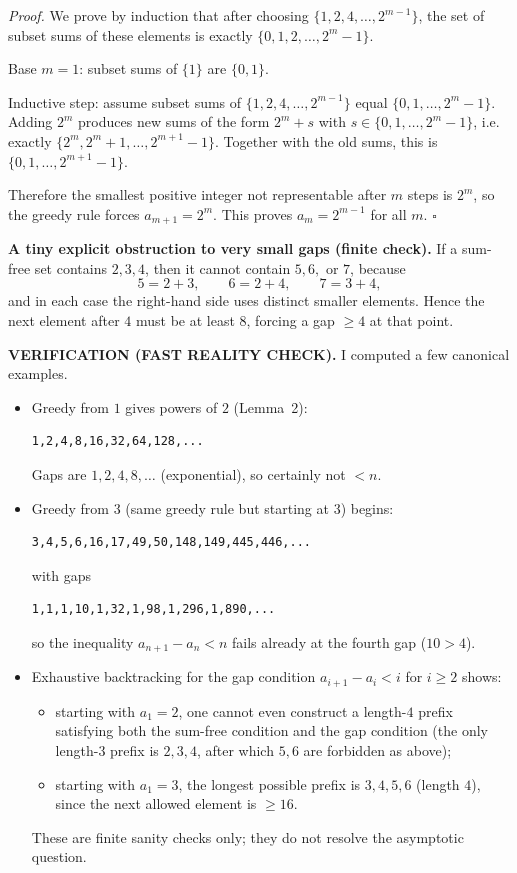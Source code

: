 \noindent\emph{Proof.}
We prove by induction that after choosing $\{1,2,4,\dots,2^{m-1}\}$, the set of subset sums of these elements is exactly $\{0,1,2,\dots,2^{m}-1\}$.

Base $m=1$: subset sums of $\{1\}$ are $\{0,1\}$.

Inductive step: assume subset sums of $\{1,2,4,\dots,2^{m-1}\}$ equal $\{0,1,\dots,2^m-1\}$. Adding $2^m$ produces new sums of the form $2^m+s$ with $s\in\{0,1,\dots,2^m-1\}$, i.e. exactly $\{2^m,2^m+1,\dots,2^{m+1}-1\}$. Together with the old sums, this is $\{0,1,\dots,2^{m+1}-1\}$.

Therefore the smallest positive integer not representable after $m$ steps is $2^m$, so the greedy rule forces $a_{m+1}=2^m$. This proves $a_m=2^{m-1}$ for all $m$.
\hfill$\square$

\medskip
\noindent\textbf{A tiny explicit obstruction to very small gaps (finite check).}
If a sum-free set contains $2,3,4$, then it cannot contain $5,6,$ or $7$, because
\[
5=2+3,\qquad 6=2+4,\qquad 7=3+4,
\]
and in each case the right-hand side uses distinct smaller elements.
Hence the next element after $4$ must be at least $8$, forcing a gap $\ge 4$ at that point.

\medskip
\noindent\textbf{VERIFICATION (FAST REALITY CHECK).}
I computed a few canonical examples.
\begin{itemize}
\item Greedy from $1$ gives powers of $2$ (Lemma~2):
\begin{verbatim}
1,2,4,8,16,32,64,128,...
\end{verbatim}
Gaps are $1,2,4,8,\dots$ (exponential), so certainly not $<n$.

\item Greedy from $3$ (same greedy rule but starting at $3$) begins:
\begin{verbatim}
3,4,5,6,16,17,49,50,148,149,445,446,...
\end{verbatim}
with gaps
\begin{verbatim}
1,1,1,10,1,32,1,98,1,296,1,890,...
\end{verbatim}
so the inequality $a_{n+1}-a_n<n$ fails already at the fourth gap ($10>4$).

\item Exhaustive backtracking for the gap condition $a_{i+1}-a_i<i$ for $i\ge 2$ shows:
\begin{itemize}
\item starting with $a_1=2$, one cannot even construct a length-$4$ prefix satisfying both the sum-free condition and the gap condition (the only length-$3$ prefix is $2,3,4$, after which $5,6$ are forbidden as above);
\item starting with $a_1=3$, the longest possible prefix is $3,4,5,6$ (length $4$), since the next allowed element is $\ge 16$.
\end{itemize}
These are finite sanity checks only; they do not resolve the asymptotic question.
\end{itemize}


